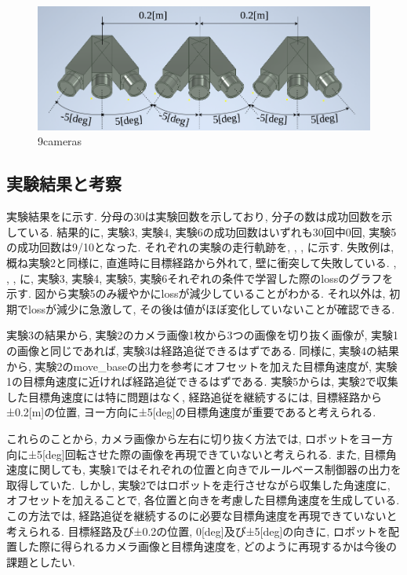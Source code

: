 \begin{figure}[h]
  \centering
  \includegraphics[keepaspectratio, scale=0.35]{images/9cam_draw.png}
  \caption{9cameras}
  \label{Fig:9cam}
\end{figure}

\newpage
\subsection{実験結果と考察}
実験結果をに示す. 分母の30は実験回数を示しており, 分子の数は成功回数を示している. 結果的に, 実験3, 実験4, 実験6の成功回数はいずれも30回中0回, 実験5の成功回数は9/10となった. それぞれの実験の走行軌跡を, , , に示す. 失敗例は, 概ね実験2と同様に, 直進時に目標経路から外れて, 壁に衝突して失敗している. , , ,  に, 実験3, 実験4, 実験5, 実験6それぞれの条件で学習した際のlossのグラフを示す. 図から実験5のみ緩やかにlossが減少していることがわかる. それ以外は, 初期でlossが減少に急激して, その後は値がほぼ変化していないことが確認できる. 
\par 実験3の結果から, 実験2のカメラ画像1枚から3つの画像を切り抜く画像が, 実験1の画像と同じであれば, 実験3は経路追従できるはずである. 同様に, 実験4の結果から, 実験2のmove\_baseの出力を参考にオフセットを加えた目標角速度が, 実験1の目標角速度に近ければ経路追従できるはずである. 実験5からは, 実験2で収集した目標角速度には特に問題はなく, 経路追従を継続するには, 目標経路から±0.2[m]の位置, ヨー方向に±5[deg]の目標角速度が重要であると考えられる. 
\par これらのことから, カメラ画像から左右に切り抜く方法では, ロボットをヨー方向に±5[deg]回転させた際の画像を再現できていないと考えられる. また, 目標角速度に関しても, 実験1ではそれぞれの位置と向きでルールベース制御器の出力を取得していた. しかし, 実験2ではロボットを走行させながら収集した角速度に, オフセットを加えることで, 各位置と向きを考慮した目標角速度を生成している. この方法では, 経路追従を継続するのに必要な目標角速度を再現できていないと考えられる. 目標経路及び±0.2の位置, 0[deg]及び±5[deg]の向きに, ロボットを配置した際に得られるカメラ画像と目標角速度を, どのように再現するかは今後の課題としたい. 

